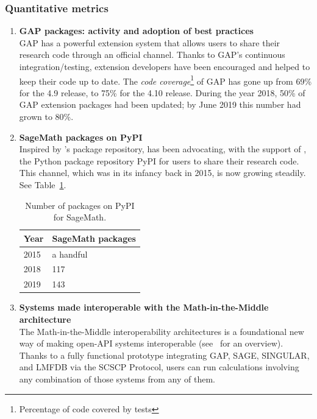 \subsubsection{Quantitative metrics}

\begin{enumerate}
\item \textbf{GAP packages: activity and adoption of best practices}\\
  GAP has a powerful extension system that allows users to share their
  research code through an official channel. Thanks to GAP's
  continuous integration/testing, extension developers have been
  encouraged and helped to keep their code up to date. The \emph{code
    coverage}\footnote{Percentage of code covered by tests} of GAP has
  gone up from 69\% for the 4.9 release, to 75\% for the 4.10 release.
  During the year 2018, 50\% of GAP extension packages had been
  updated; by June 2019 this number had grown to 80\%.
\item \textbf{SageMath packages on PyPI}\\
  Inspired by \GAP's package repository, \SageMath has been
  advocating, with the support of \ODK, the Python package repository
  PyPI for users to share their research code. This channel, which
  was in its infancy back in 2015, is now growing steadily. See
  Table~\ref{fig:count-pypi}.
  \begin{table}[h]
  \begin{tabular}{|l|l|}\hline
    Year & SageMath packages \\
    \hline
    2015 & a handful \\
    2018 & 117 \\
    2019 & 143 \\
    \hline
  \end{tabular}
  \caption{Number of packages on PyPI for SageMath.}
  \label{fig:count-pypi}
  \end{table}

\item \textbf{Systems made interoperable with the Math-in-the-Middle architecture}\\
  The Math-in-the-Middle interoperability architectures is a
  foundational new way of making open-API systems interoperable
  (see~ for an overview). Thanks to a fully functional
  prototype integrating GAP, SAGE, SINGULAR, and LMFDB via the SCSCP
  Protocol, users can run calculations involving any combination of
  those systems from any of them.


\end{enumerate}
